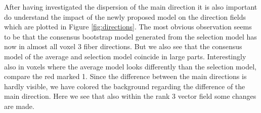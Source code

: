 After having investigated the dispersion of the main direction it is also
important do understand the impact of the newly proposed model on the direction
fields which are plotted in Figure \ref{fig:directions}. 
The most obvious observation seems to be that the consensus bootstrap model generated
from the selection model has now in almost all voxel 3 fiber directions. But we
also see that the consensus model of the average and selection model coincide in
large parts. Interestingly also in voxels where the average model looks
differently than the selection model, compare the red marked 1. 
Since the difference between the main directions is hardly visible, we have
colored the background regarding the difference of the main direction. Here we
see that also within the rank $3$ vector field some changes are made. 

